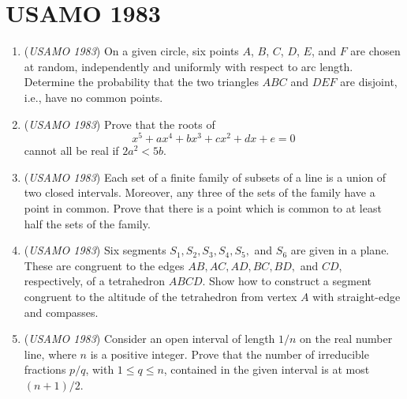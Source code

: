 \section{USAMO 1983}
        \begin{enumerate}
        	\item (\textit{USAMO 1983}) On a given circle, six points $A$, $B$, $C$, $D$, $E$, and $F$ are chosen at random, independently and uniformly with respect to arc length. Determine the probability that the two triangles $ABC$ and $DEF$ are disjoint, i.e., have no common points.


 

	\item (\textit{USAMO 1983}) Prove that the roots of 
 \[x^5 + ax^4 + bx^3 + cx^2 + dx + e = 0\] cannot all be real if $2a^2 < 5b$.


 

	\item (\textit{USAMO 1983}) Each set of a finite family of subsets of a line is a union of two closed intervals. Moreover, any three of the sets of the family have a point in common. Prove that there is a point which is common to at least half the sets of the family.


 

	\item (\textit{USAMO 1983}) Six segments $S_1, S_2, S_3, S_4, S_5,$ and $S_6$ are given in a plane. These are congruent to the edges $AB, AC, AD, BC, BD,$ and $CD$, respectively, of a tetrahedron $ABCD$. Show how to construct a segment congruent to the altitude of the tetrahedron from vertex $A$ with straight-edge and compasses.


 

	\item (\textit{USAMO 1983}) Consider an open interval of length $1/n$ on the real number line, where $n$ is a positive integer. Prove that the number of irreducible fractions $p/q$, with $1\le q\le n$, contained in the given interval is at most $(n+1)/2$.


 

\end{enumerate}
